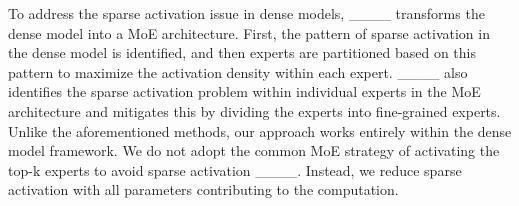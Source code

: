 To address the sparse activation issue in dense models, ____ transforms the dense model into a MoE architecture. First, the pattern of sparse activation in the dense model is identified, and then experts are partitioned based on this pattern to maximize the activation density within each expert. ____ also identifies the sparse activation problem within individual experts in the MoE architecture and mitigates this by dividing the experts into fine-grained experts. Unlike the aforementioned methods, our approach works entirely within the dense model framework. We do not adopt the common MoE strategy of activating the top-k experts to avoid sparse activation ____. Instead, we reduce sparse activation with all parameters contributing to the computation.

%